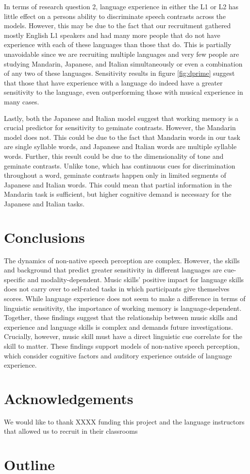 \documentclass[a4paper]{article}
\begin{document}
In terms of research question 2, language experience in either the L1 or L2 has little effect on a persons ability to discriminate speech contrasts across the models. However, this may be due to the fact that our recruitment gathered mostly English L1 speakers and had many more people that do not have experience with each of these languages than those that do. This is partially unavoidable since we are recruiting multiple languages and very few people are studying Mandarin, Japanese, and Italian simultaneously or even a combination of any two of these languages. Sensitivity results in figure \ref{fig:dprime} suggest that those that have experience with a language do indeed have a greater sensitivity to the language, even outperforming those with musical experience in many cases. 

Lastly, both the Japanese and Italian model suggest that working memory is a crucial predictor for sensitivity to geminate contrasts. However, the Mandarin model does not. This could be due to the fact that Mandarin words in our task are single syllable words, and Japanese and Italian words are multiple syllable words. Further, this result could be due to the dimensionality of tone and geminate contrasts. Unlike tone, which has continuous cues for discrimination throughout a word, geminate contrasts happen only in limited segments of Japanese and Italian words. This could mean that partial information in the Mandarin task is sufficient, but higher cognitive demand is necessary for the Japanese and Italian tasks.

\section{Conclusions}

The dynamics of non-native speech perception are complex. However, the skills and background that predict greater sensitivity in different languages are cue-specific and modality-dependent. Music skills' positive impact for language skills does not carry over to self-rated tasks in which participants give themselves scores. While language experience does not seem to make a difference in terms of linguistic sensitivity, the importance of working memory is language-dependent. Together, these findings suggest that the relationship between music skills and experience and language skills is complex and demands future investigations. Crucially, however, music skill must have a direct linguistic cue correlate for the skill to matter. These findings support models of non-native speech perception, which consider cognitive factors and auditory experience outside of language experience.

\section{Acknowledgements}

We would like to thank XXXX funding this project and the language instructors that allowed us to recruit in their classrooms




\section{Outline}

\end{document}
